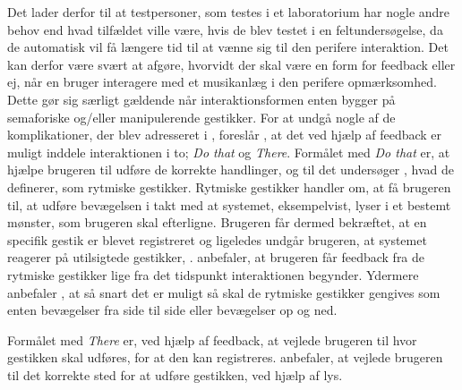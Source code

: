 Det lader derfor til at testpersoner, som testes i et laboratorium har nogle andre behov end hvad tilfældet ville være, hvis de blev testet i en feltundersøgelse, da de automatisk vil få længere tid til at vænne sig til den perifere interaktion. Det kan derfor være svært at afgøre, hvorvidt der skal være en form for feedback eller ej, når en bruger interagere med et musikanlæg i den perifere opmærksomhed. Dette gør sig særligt gældende når interaktionsformen enten bygger på semaforiske og/eller manipulerende gestikker. \blankline 
%
For at undgå nogle af de komplikationer, der blev adresseret i , foreslår \textcite{PDF:DoThatThere}, at det ved hjælp af feedback er muligt inddele interaktionen i to; \textit{Do that} og \textit{There}. Formålet med \textit{Do that} er, at hjælpe brugeren til udføre de korrekte handlinger, og til det undersøger \textcite[s. 4]{PDF:DoThatThere}, hvad de definerer, som rytmiske gestikker. Rytmiske gestikker handler om, at få brugeren til, at udføre bevægelsen i takt med at systemet, eksempelvist, lyser i et bestemt mønster, som brugeren skal efterligne. Brugeren får dermed bekræftet, at en specifik gestik er blevet registreret og ligeledes undgår brugeren, at systemet reagerer på utilsigtede gestikker, \parencite[s. 4]{PDF:DoThatThere}. \textcite[s. 10]{PDF:DoThatThere} anbefaler, at brugeren får feedback fra de rytmiske gestikker lige fra det tidspunkt interaktionen begynder. Ydermere anbefaler \textcite[s. 10]{PDF:DoThatThere}, at så snart det er muligt så skal de rytmiske gestikker gengives som enten bevægelser fra side til side eller bevægelser op og ned. 

Formålet med \textit{There} er, ved hjælp af feedback, at vejlede brugeren til hvor gestikken skal udføres, for at den kan registreres. \textcite[s. 10]{PDF:DoThatThere} anbefaler, at vejlede brugeren til det korrekte sted for at udføre gestikken, ved hjælp af lys. 






  

